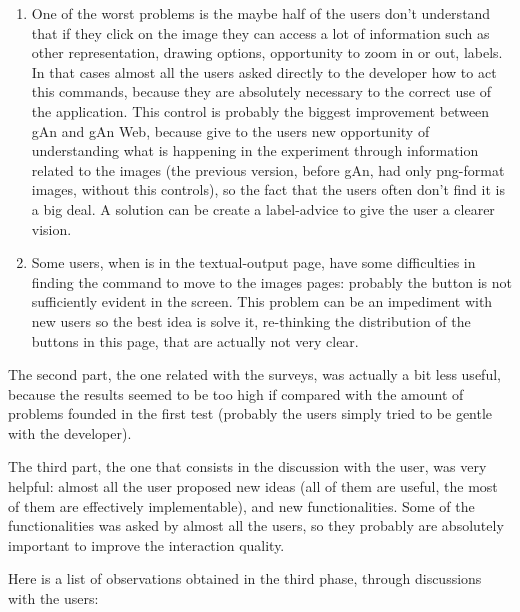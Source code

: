\begin{enumerate}
\item 
One of the worst problems is the maybe half of the users don't understand that if they click on the image they can access a lot of information such as other representation, drawing options, opportunity to zoom in or out, labels. In that cases almost all the users asked directly to the developer how to act this commands, because they are absolutely necessary to the correct use of the application. This control is probably the biggest improvement between gAn and gAn Web, because give to the users new opportunity of understanding what is happening in the experiment through information related to the images (the previous version, before gAn, had only png-format images, without this controls), so the fact that the users often don't find it is a big deal. A solution can be create a label-advice to give the user a clearer vision.

\item
Some users, when is in the textual-output page, have some difficulties in finding the command to move to the images pages: probably the button is not sufficiently evident in the screen. This problem can be an impediment with new users so the best idea is solve it, re-thinking the distribution of the buttons in this page, that are actually not very clear. 

\end{enumerate}

The second part, the one related with the surveys, was actually a bit less useful, because the results seemed to be too high if compared with the amount of problems founded in the first test (probably the users simply tried to be gentle with the developer).

The third part, the one that consists in the discussion with the user, was very helpful: almost all the user proposed new ideas (all of them are useful, the most of them are effectively implementable), and new functionalities. Some of the functionalities was asked by almost all the users, so they probably are absolutely important to improve the interaction quality. 

Here is a list of observations obtained in the third phase, through discussions with the users:

